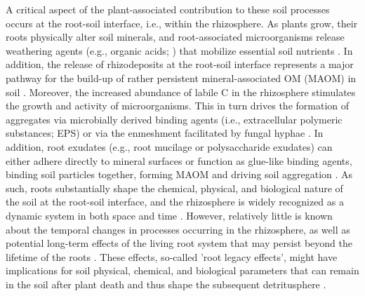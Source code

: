 A critical aspect of the plant-associated contribution to these soil processes occurs at the root-soil interface, i.e., within the rhizosphere. As plants grow, their roots physically alter soil minerals, and root-associated microorganisms release weathering agents (e.g., organic acids; \citealp{Uroz2009}) that mobilize essential soil nutrients \citep{Gregory2022}. 
In addition, the release of rhizodeposits at the root-soil interface represents a major pathway for the build-up of rather persistent mineral-associated OM (MAOM) in soil \citep{Sokol2019, Villarino2021}. Moreover, the increased abundance of labile C in the rhizosphere stimulates the growth and activity of microorganisms. This in turn drives the formation of aggregates via microbially derived binding agents (i.e., extracellular polymeric substances; EPS) or via the enmeshment facilitated by fungal hyphae \citep{Chenu2011, Costa2018}. In addition, root exudates (e.g., root mucilage or polysaccharide exudates) can either adhere directly to mineral surfaces or function as glue-like binding agents, binding soil particles together, forming MAOM \citep{Roetzer2023} and driving soil aggregation \citep{Baumert2018}. As such, roots substantially shape the chemical, physical, and biological nature of the soil at the root-soil interface, and the rhizosphere is widely recognized as a dynamic system in both space and time \citep{Jones2009, Hinsinger2009, Kuzyakov2019}. However, relatively little is known about the temporal changes in processes occurring in the rhizosphere, as well as potential long-term effects of the living root system that may persist beyond the lifetime of the roots \citep{Oliver2021}. These effects, so-called 'root legacy effects', might have implications for soil physical, chemical, and biological parameters that can remain in the soil after plant death and thus shape the subsequent detritusphere \citep{Wurst2015}.

